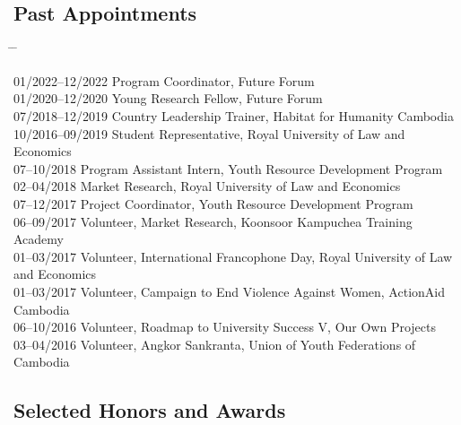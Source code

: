 \documentclass[10pt,a4paper]{article}
\newcommand{\tabbedblock}[1]{

	\begin{tabbing}
		\hspace{3cm} \= \hspace{4cm} \= \kill
		#1
	\end{tabbing}
}
\begin{document}
\subsection*{Past Appointments}

\tabbedblock{

	01/2022--12/2022 \> Program Coordinator, Future Forum \\

	01/2020--12/2020 \> Young Research Fellow, Future Forum \\

	07/2018--12/2019 \> Country Leadership Trainer, Habitat for Humanity Cambodia\\

	10/2016--09/2019 \> Student Representative, Royal University of Law and Economics\\

	07--10/2018 \> Program Assistant Intern, Youth Resource Development Program\\

	02--04/2018 \> Market Research, Royal University of Law and Economics\\

	07--12/2017 \> Project Coordinator, Youth Resource Development Program\\ 

	06--09/2017 \> Volunteer, Market Research, Koonsoor Kampuchea Training Academy\\

	01--03/2017 \> Volunteer, International Francophone Day,  Royal University of Law and Economics\\

	01--03/2017 \> Volunteer, Campaign to End Violence Against Women, ActionAid Cambodia\\

	06--10/2016 \> Volunteer, Roadmap to University Success V, Our Own Projects\\

	03--04/2016 \> Volunteer, Angkor Sankranta, Union of Youth Federations of Cambodia
}

\subsection*{Selected Honors and Awards}
\end{document}
